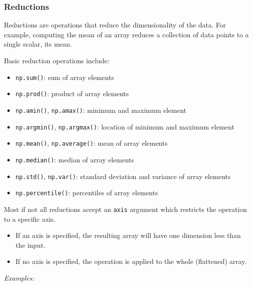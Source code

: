 \documentclass{scrartcl}
\providecommand{\tightlist}{%
      \setlength{\itemsep}{0pt}\setlength{\parskip}{0pt}}
\begin{document}
    \hypertarget{reductions}{%
\subsubsection{Reductions}\label{reductions}}

Reductions are operations that reduce the dimensionality of the data.
For example, computing the mean of an array reduces a collection of data
points to a single scalar, its mean.

Basic reduction operations include:

\begin{itemize}
\tightlist
\item
  \texttt{np.sum()}: sum of array elements
\item
  \texttt{np.prod()}: product of array elements
\item
  \texttt{np.amin()}, \texttt{np.amax()}: minimum and maximum element
\item
  \texttt{np.argmin()}, \texttt{np.argmax()}: location of minimum and
  maximum element
\item
  \texttt{np.mean()}, \texttt{np.average()}: mean of array elements
\item
  \texttt{np.median()}: median of array elements
\item
  \texttt{np.std()}, \texttt{np.var()}: standard deviation and variance
  of array elements
\item
  \texttt{np.percentile()}: percentiles of array elements
\end{itemize}

Most if not all reductions accept an \texttt{axis} argument which
restricts the operation to a specific axis.

\begin{itemize}
\tightlist
\item
  If an axis is specified, the resulting array will have one dimension
  less than the input.
\item
  If no axis is specified, the operation is applied to the whole
  (flattened) array.
\end{itemize}

\emph{Examples:}
\end{document}
